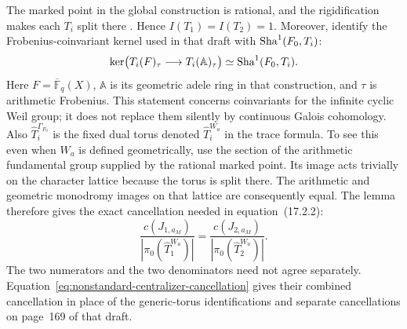 The marked point in the global construction is rational, and the
rigidification makes each $T_i$ split there
\citep[Section~14.1 and the proof of Lemma~15.11]{HalleckDubeWFLDraft}.
Hence $I(T_1)=I(T_2)=1$.  Moreover,
\citet[Lemma~12.2.5, pp.~1735--1736]{ChaudouardLaumon2012II}
identify the Frobenius-coinvariant kernel used in that draft with
$\operatorname{Sha}^1(F_0,T_i)$:
\[
 \ker\bigl(T_i(F)_\tau\longrightarrow T_i(\mathbb A)_\tau\bigr)
       \simeq\operatorname{Sha}^1(F_0,T_i).
\]
Here $F=\overline{\mathbb F}_q(X)$, $\mathbb A$ is its geometric
adele ring in that construction, and $\tau$ is arithmetic Frobenius.
This statement concerns coinvariants for the infinite cyclic Weil
group; it does not replace them silently by continuous Galois
cohomology.  Also $\widehat T_i^{\Gamma_{F_0}}$ is the fixed dual torus
denoted $\widehat T_i^{W_a}$ in the trace formula.  To see this even
when $W_a$ is defined geometrically, use the section of the arithmetic
fundamental group supplied by the rational marked point.  Its image
acts trivially on the character lattice because the torus is split
there.  The arithmetic and geometric monodromy images on that lattice
are consequently equal.  The lemma therefore
gives the exact cancellation needed in equation~(17.2.2):
\begin{equation}
 \label{eq:nonstandard-centralizer-cancellation}
 \frac{c(J_{1,a_M})}{|\pi_0(\widehat T_1^{W_a})|}
       =\frac{c(J_{2,a_M})}{|\pi_0(\widehat T_2^{W_a})|}.
\end{equation}
The two numerators and the two denominators need not agree separately.
Equation~\eqref{eq:nonstandard-centralizer-cancellation} gives their
combined cancellation in place of the generic-torus identifications
and separate cancellations on page~169 of that draft.

